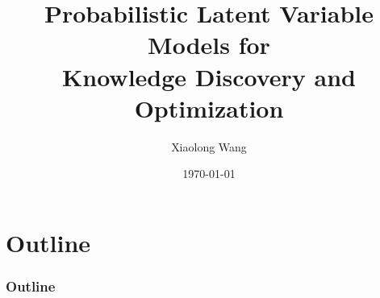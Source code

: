\documentclass[overlystylish,slidestop,mathserif,compress]{beamer}
\theoremstyle{plain}
\theoremstyle{definition}
\theoremstyle{remark}
\begin{document}
\title[PLVM]{Probabilistic Latent Variable Models for  \\
  Knowledge Discovery and Optimization}
\author{Xiaolong Wang}
\date{\today}

\begin{frame}
\titlepage
\end{frame}

\section*{Outline}
\begin{frame}[shrink]
\frametitle{Outline}
\tableofcontents
\end{frame}



\end{document}
